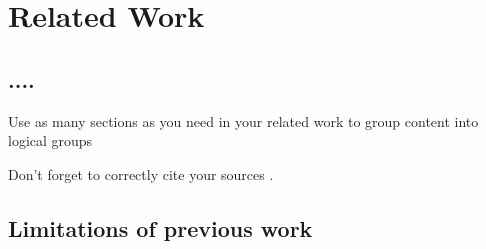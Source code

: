 

    \chapter{Related Work}

    \section{....}
    Use as many sections as you need in your related work to group content into logical groups

    Don't forget to correctly cite your sources \cite{art1}.
    \section{Limitations of previous work}


